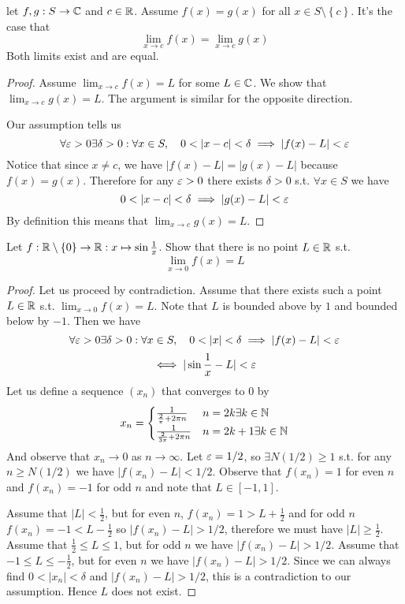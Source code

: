 \begin{proposition}
  let $f,g:S\to\mathbb C$ and $c\in\mathbb R$. Assume $f(x)=g(x)$ for all $x\in S\setminus\left\{
  c \right\}$. It's the case that
  \[\lim_{x\to c}f(x) = \lim_{x\to c}g(x)\]
  Both limits exist and are equal.
  \label{prop:limitsEq}
\end{proposition}
\begin{proof}
  Assume $\lim_{x\to c} f(x)=L$ for some $L\in\mathbb C$. We show that $\lim_{x\to c}
  g(x)=L$. The argument is similar for the opposite direction. 

  Our assumption tells us 
  \[\forall\eps>0\exists\delta>0 : \forall x\in S, \quad 0<|x-c|<\delta \implies |f(x)-L|<\eps\]
  Notice that since $x\neq c$, we have $|f(x)-L|=|g(x)-L|$ because $f(x)=g(x)$.
  Therefore for any $\varepsilon>0$ there exists $\delta>0$ s.t. $\forall x\in S$ we have 
  \[0<|x-c|<\delta \implies |g(x)-L|<\eps\]
  By definition this means that $\lim_{x\to c}g(x)=L$.
\end{proof}

\begin{exercise}
  Let $f:\mathbb R\setminus\left\{ 0 \right\}\to\mathbb R: x\mapsto \sin \frac{1}{x}$. Show that there
  is no point $L\in\mathbb R$ s.t. 
  \[\lim_{x\to 0} f(x)=L\]
\end{exercise}
\begin{proof}
  Let us proceed by contradiction. Assume that there exists such a point $L\in\mathbb R$ s.t.
  $\lim_{x\to 0}f(x)=L$. Note that $L$ is bounded above by $1$ and bounded below by $-1$.
  Then we have 
  \[\forall\eps>0\exists\delta>0 : \forall x\in S, \quad 0<|x|<\delta \implies |f(x)-L|<\eps\]
  \[\iff |\sin\frac{1}{x} - L| <\varepsilon\]
  Let us define a sequence $(x_n)$ that converges to $0$ by  
  \[
    x_n = 
    \begin{cases}
      \frac{1}{\frac{2}{\pi} + 2\pi n} & n=2k \exists k\in\mathbb N \\
      \frac{1}{\frac{2}{3\pi} + 2\pi n} & n=2k+1 \exists k\in\mathbb N \\
    \end{cases}
  \]
  And observe that $x_n\to 0$ as $n\to\infty$. Let $\varepsilon=1/2$, so $\exists N(1/2)\geq 1$
  s.t. for any $n\geq N(1/2)$ we have $|f(x_n)-L|<1/2$. Observe that $f(x_n)=1$ for even
  $n$ and $f(x_n)=-1$ for odd $n$ and note that $L\in[-1,1]$.
  
  Assume that $|L|<\frac{1}{2}$, but for even $n$, $f(x_n)=1>L+\frac{1}{2}$ and for odd
  $n$ $f(x_n)=-1 < L-\frac{1}{2}$ so $|f(x_n) -L| >1/2$, therefore we must have  $|L|\geq
  \frac{1}{2}$. Assume that $\frac{1}{2}\leq L \leq 1$, but for odd $n$  we have
  $|f(x_n)-L|>1/2$. Assume that $-1\leq L\leq-\frac{1}{2}$, but for even $n$ we have
  $|f(x_n)-L|>1/2$. Since we can always find $0<|x_n|<\delta$ and $|f(x_n)-L|>1/2$, this is
  a contradiction to our assumption. Hence $L$ does not exist.
\end{proof}

